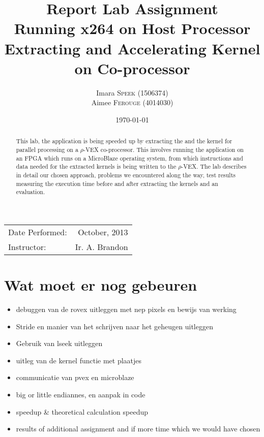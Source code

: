 \documentclass{article}
\title{Report Lab Assignment \\ Running x264 on Host Processor\\ Extracting and Accelerating Kernel on Co-processor} %
\author{Imara \textsc{Speek} (1506374)\\ Aimee \textsc{Ferouge} (4014030)} %
\date{\today} %
\begin{document}
\maketitle %

\begin{center}
\begin{tabular}{l r}
Date Performed: & October, 2013 \\ %
Instructor: & Ir. A. Brandon %
\end{tabular}
\end{center}

 \begin{abstract}
 This lab, the  application is being speeded up by extracting the  and the  kernel for parallel processing on a $\rho$-VEX co-processor. This involves running the application on an FPGA which runs on a MicroBlaze operating system, from which instructions and data needed for the extracted kernels is being written to the $\rho$-VEX. The lab describes in detail our chosen approach, problems we encountered along the way, test results measuring the execution time before and after extracting the kernels and an evaluation.
 \end{abstract}


\section{Wat moet er nog gebeuren}
\begin{itemize}
\item debuggen van de rovex uitleggen met nep pixels en bewijs van werking
\item Stride en manier van het schrijven naar het geheugen uitleggen
\item Gebruik van lseek uitleggen
\item uitleg van de kernel functie met plaatjes
\item communicatie van pvex en microblaze
\item big or little endiannes, en aanpak in code
\item speedup \& theoretical calculation speedup
\item results of additional assignment and if more time which we would have chosen
\end{itemize}
\end{document}
